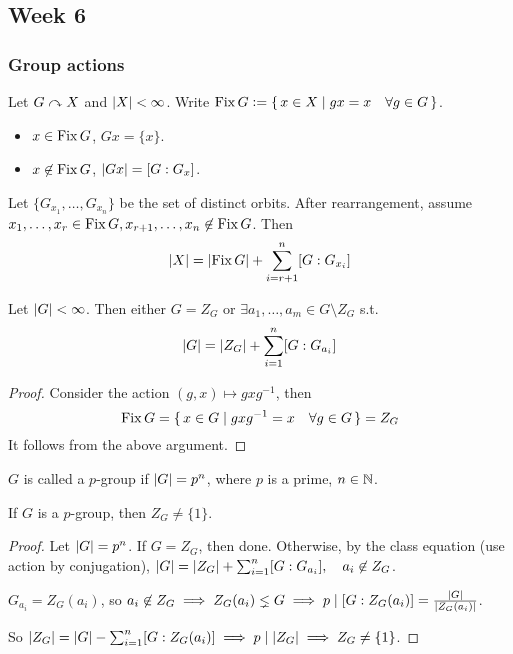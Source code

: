 \subsection{Week 6}
\subsubsection{Group actions }

\begin{definition}
  Let $G \curvearrowright X$ and $\lvert X\rvert < \infty$.
  Write $\operatorname{Fix} G \vcentcolon= \{\, x \in X \mid gx = x \quad \forall g \in G \,\}$.
\end{definition}

\begin{itemize}
  \item $x \in \operatorname{Fix} G$, $Gx = \{ x \}$.
  \item $x \not\in \operatorname{Fix} G$, $\lvert Gx\rvert = [G : G_x]$.
\end{itemize}

Let $\{ G_{x_1}, \dots, G_{x_n} \}$ be the set of distinct orbits.
After rearrangement, assume $x_1, \dots, x_r \in \operatorname{Fix} G,
x_{r+1}, \dots, x_n \not\in \operatorname{Fix} G$. Then
\[
  \lvert X\rvert = \lvert\operatorname{Fix} G\rvert + \sum_{i=r+1}^{n} [G : G_{x_i}]
\]

\begin{theorem}
  Let $\lvert G\rvert < \infty$. Then either $G = Z_G$ or
  $\exists a_1, \dots, a_m \in G \setminus Z_G$ s.t.
  \[
    \lvert G\rvert = \lvert Z_G\rvert + \sum_{i=1}^{n} [G : G_{a_i}]
  \]
  \begin{proof}
    Consider the action $(g, x) \mapsto gxg^{-1}$, then
    \[
      \operatorname{Fix} G = \{\, x \in G \mid gxg^{-1} = x \quad \forall g \in G \,\}
      = Z_G
    \]
    It follows from the above argument.
  \end{proof}
\end{theorem}

\begin{definition}
  $G$ is called a $p$-group if $\lvert G\rvert = p^n$, where $p$ is a prime,
  $n \in \mathbb{N}$.
\end{definition}

\begin{prop}
  If $G$ is a $p$-group, then $Z_G \ne \{ 1 \}$.
  \begin{proof}
    Let $\lvert G\rvert = p^n$. If $G = Z_G$, then done.
    Otherwise, by the class equation (use action by conjugation),
    $\lvert G\rvert = \lvert Z_G\rvert + \sum_{i=1}^{n} [G : G_{a_i}], \quad a_i \not\in Z_G$.

    $G_{a_i} = Z_G(a_i)$, so $a_i \not\in Z_G \implies Z_G(a_i) \lneq G
    \implies p \mid [G:Z_G(a_i)] = \frac{\lvert G\rvert}{\lvert Z_G(a_i)\rvert}$.

    So $\lvert Z_G\rvert = \lvert G\rvert - \sum_{i=1}^{n} [G : Z_G(a_i)]
    \implies p \mid \lvert Z_G\rvert \implies Z_G \ne \{ 1 \}$.
  \end{proof}
  \label{prop:pgroup}
\end{prop}

